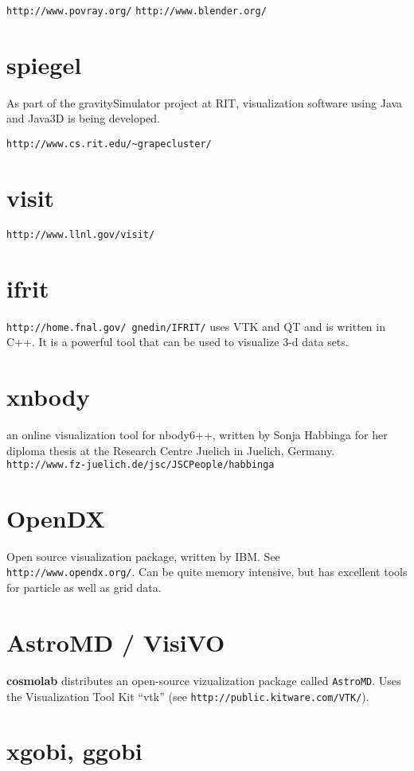 {{\tt http://www.povray.org/}
{\tt http://www.blender.org/}

\section{spiegel}

As part of the gravitySimulator project at RIT, visualization software using Java
and Java3D is being developed.

\verb+http://www.cs.rit.edu/~grapecluster/+

\section{visit}

{\tt http://www.llnl.gov/visit/}

\section{ifrit}

{\tt http://home.fnal.gov/~gnedin/IFRIT/}
uses VTK and QT and is
written in C++. It is a powerful
tool that can be used to visualize 3-d data sets.

\section{xnbody}

an online visualization tool for nbody6++, written by
Sonja Habbinga for her diploma thesis at the
Research Centre Juelich in Juelich, Germany. 
{\tt http://www.fz-juelich.de/jsc/JSCPeople/habbinga}


\section{OpenDX}

Open source visualization package, written by IBM. See 
{\tt http://www.opendx.org/}. Can be quite memory intensive, but has
excellent tools for particle as well as grid data.

\section{AstroMD / VisiVO}

{\bf cosmolab} distributes an open-source vizualization package 
called {\tt AstroMD}.  Uses the Visualization Tool Kit ``vtk''
(see {\tt http://public.kitware.com/VTK/}).

\section{xgobi, ggobi}

}
